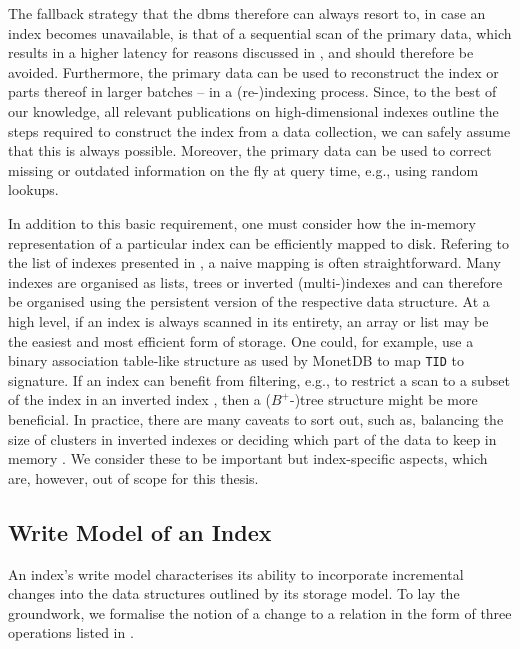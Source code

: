 The fallback strategy that the \acrshort{dbms} therefore can always resort to, in case an index becomes unavailable, is that of a sequential scan of the primary data, which results in a higher latency for reasons discussed in , and should therefore be avoided. Furthermore, the primary data can be used to reconstruct the index or parts thereof in larger batches -- in a (re-)indexing process. Since, to the best of our knowledge, all relevant publications on high-dimensional indexes outline the steps required to construct the index from a data collection, we can safely assume that this is always possible. Moreover, the primary data can be used to correct missing or outdated information on the fly at query time, e.g., using random lookups.

In addition to this basic requirement, one must consider how the in-memory representation of a particular index can be efficiently mapped to disk. Refering to the list of indexes presented in , a naive mapping is often straightforward. Many indexes are organised as lists, trees or inverted (multi-)indexes \cite{Sivic:2003Video,Babenko:2014Inverted} and can therefore be organised using the persistent version of the respective data structure. At a high level, if an index is always scanned in its entirety, an array or list may be the easiest and most efficient form of storage. One could, for example, use a binary association table-like structure as used by MonetDB \cite{Idreos:2012MonetDB} to map \texttt{TID} to signature. If an index can benefit from filtering, e.g., to restrict a scan to a subset of the index in an inverted index \cite{Chierichetti:2007Finding,Gudmundsson:2010Large,Jegou:2010Product}, then a ($B^{+}$-)tree structure might be more beneficial. In practice, there are many caveats to sort out, such as, balancing the size of clusters in inverted indexes \cite{Hojsgaard:2019Index} or deciding which part of the data to keep in memory \cite{Lejsek:2009NVTree,Jayaram:2019DiskANN,Chen:2021SPANN}. We consider these to be important but index-specific aspects, which are, however, out of scope for this thesis.

\subsection{Write Model of an Index}
An index's write model characterises its ability to incorporate incremental changes into the data structures outlined by its storage model. To lay the groundwork, we formalise the notion of a change to a relation in the form of three operations listed in . 

